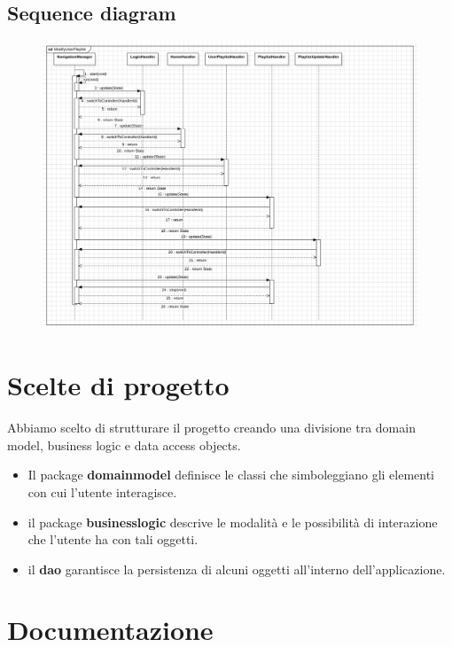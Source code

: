 \documentclass{article}
\begin{document}
  \subsection{Sequence diagram}
  \begin{figure}[H]
    \includegraphics[scale=0.30]{sequenze01}
  \end{figure}


  \section{Scelte di progetto}

  Abbiamo scelto di strutturare il progetto creando una divisione tra domain model, business logic e data
  access objects.
  \begin{itemize}
    \item
    Il package  \textbf{domainmodel} definisce le classi che simboleggiano gli elementi con cui l'utente
    interagisce.
    \item
    il package \textbf{businesslogic} descrive le modalità e le possibilità di interazione che l'utente
    ha con tali oggetti.
    \item
    il \textbf{dao} garantisce la persistenza di alcuni oggetti all'interno dell'applicazione.

  \end{itemize}


  \section{Documentazione}
\end{document}
